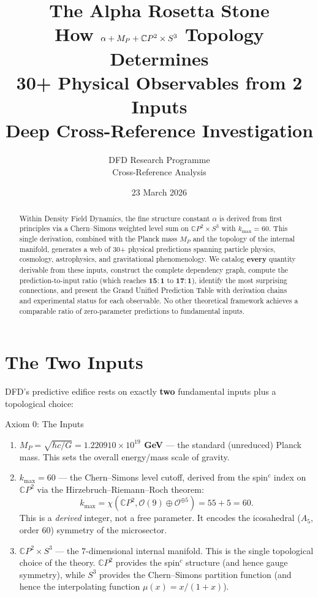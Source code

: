 \documentclass[12pt,a4paper]{article}
\title{\Huge The Alpha Rosetta Stone\\[12pt]
\Large How $\alpha + M_P + \CP^2 \times S^3$ Topology Determines\\
30+ Physical Observables from 2 Inputs\\[12pt]
\normalsize Deep Cross-Reference Investigation}
\author{DFD Research Programme\\
Cross-Reference Analysis}
\date{23 March 2026}
\newcommand{\CP}{\mathbb{C}P}
\begin{document}
\maketitle

\begin{abstract}
Within Density Field Dynamics, the fine structure constant $\alpha$ is
derived from first principles via a Chern--Simons weighted level sum on
$\CP^2 \times S^3$ with $k_{\max} = 60$.  This single derivation, combined
with the Planck mass $M_P$ and the topology of the internal manifold,
generates a web of 30+ physical predictions spanning particle physics,
cosmology, astrophysics, and gravitational phenomenology.  We catalog
\textbf{every} quantity derivable from these inputs, construct the complete
dependency graph, compute the prediction-to-input ratio (which reaches
$\mathbf{15{:}1}$ to $\mathbf{17{:}1}$), identify the most surprising
connections, and present the Grand Unified Prediction Table with
derivation chains and experimental status for each observable.  No other
theoretical framework achieves a comparable ratio of zero-parameter
predictions to fundamental inputs.
\end{abstract}

\tableofcontents
\newpage

\section{The Two Inputs}
\label{sec:inputs}

DFD's predictive edifice rests on exactly \textbf{two} fundamental inputs
plus a topological choice:

\begin{rosettabox}{Axiom 0: The Inputs}
\begin{enumerate}[nosep]
\item \textbf{$M_P = \sqrt{\hbar c / G} = 1.220910 \times 10^{19}$ GeV}
  --- the standard (unreduced) Planck mass.  This sets the overall
  energy/mass scale of gravity.

\item \textbf{$k_{\max} = 60$} --- the Chern--Simons level cutoff, derived
  from the spin$^c$ index on $\CP^2$ via the Hirzebruch--Riemann--Roch
  theorem:
  \[
    k_{\max} = \chi(\CP^2, \mathcal{O}(9) \oplus \mathcal{O}^{\oplus 5})
    = 55 + 5 = 60.
  \]
  This is a \textit{derived} integer, not a free parameter.  It encodes
  the icosahedral ($A_5$, order 60) symmetry of the microsector.

\item \textbf{$\CP^2 \times S^3$} --- the 7-dimensional internal manifold.
  This is the single topological choice of the theory.  $\CP^2$ provides
  the spin$^c$ structure (and hence gauge symmetry), while $S^3$ provides
  the Chern--Simons partition function (and hence the interpolating function
  $\mu(x) = x/(1+x)$).
\end{enumerate}
\end{rosettabox}
\end{document}
